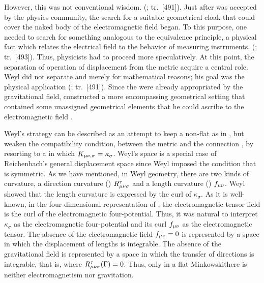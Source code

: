 \documentclass[submitted]{article}
\renewcommand{\Mink}{Minkowski\xspace}
\newcommand{\faradaymn}{\ensuremath{f\mn}}
\newcommand{\faraday}{\ensuremath{f}}
\renewcommand{\rzlap}[2]{(\cite[#1]{Reichenbach1928}; tr.\ [#2])\xspace}
\begin{document}
However, this was not conventional wisdom.  \rzlap{352}{491}. Just after \gr was accepted by the physics community, the search for a suitable geometrical cloak that could cover the naked body of the electromagnetic field began. To this purpose, one needed to search for something analogous to the equivalence principle, a physical fact which relates the electrical field to the behavior of measuring instruments.  \rzlap{354}{493}. Thus, physicists had to proceed more speculatively. At this point, the separation of operation of displacement from the metric acquire a central role. Weyl did not separate \Gtmn and \gmn merely for mathematical reasons; his goal was the physical application \rzlap{354}{491}. Since the \gmn were already appropriated by the gravitational field, \citet{Weyl1918a} constructed a more encompassing geometrical setting that contained some unassigned geometrical elements that he could ascribe to the electromagnetic field .

Weyl's strategy can be described as an attempt to keep a non-flat \spti as in \gr, but weaken the compatibility condition, between the metric \gmn and the connection \Gtnm, by resorting to a  in which $K_{\mu \nu, \sigma} =\kappa_\sigma$. Weyl's space is a special case of Reichenbach's general displacement space since Weyl imposed the condition that \Gtmn is symmetric. As we have mentioned, in Weyl geometry, there are two kinds of curvature, a direction curvature () $R_{\mu \nu \sigma}^{\tau}$ and a length curvature () $\faraday\mn$. Weyl showed that the length curvature is expressed by the curl of $\kappa_\sigma$. As it is well-known, in the four-dimensional representation of \Maxwell \ed, the electromagnetic tensor field is the curl of the electromagnetic four-potential. Thus, it was natural to interpret $\kappa_\sigma$ as the electromagnetic four-potential and its curl $f_{\mu\nu}$ as the electromagnetic tensor. The absence of the electromagnetic field $\faradaymn = 0$ is represented by a space in which the displacement of lengths is integrable. The absence of the gravitational field is represented by a space in which the transfer of directions is integrable, that is, where $R_{\mu \nu \sigma}^{\tau}(\Gamma)= 0$. Thus, only in a flat \Mink \st there is neither electromagnetism nor gravitation.
\end{document}
